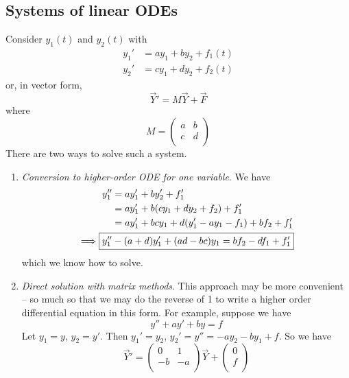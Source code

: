 \documentclass{../../template/note}
\begin{document}
    
    \subsection{Systems of linear ODEs}

    Consider \(y_1(t)\) and \(y_2(t)\) with
    \begin{align*}
        y_1' &= a y_1 + b y_2 + f_1(t) \\
        y_2' &= c y_1 + d y_2 + f_2(t)
    \end{align*}
    or, in vector form,
    \[
        \vec Y' = M \vec Y + \vec F
    \]
    where
    \[
        M = \begin{pmatrix}
         a & b \\
         c & d \\
        \end{pmatrix}
    \]
    There are two ways to solve such a system.
    \begin{enumerate}[label=\protect\circled{\arabic*}]
        \item \emph{Conversion to higher-order ODE for one variable}. We have
        \begin{align*}
            y_1'' &= ay_1' + by_2' + f_1' \\
            &= ay_1' + b(cy_1 + dy_2 + f_2) + f_1' \\
            &= ay_1' + bcy_1 + d(y_1' - ay_1 - f_1) + bf_2 + f_1' \\
            \implies \Aboxed{y_1'' &- (a+d)y_1' + (ad-bc)y_1 = bf_2 - df_1 + f_1'}
        \end{align*}
        which we know how to solve.
        \item \emph{Direct solution with matrix methods}. This approach may be more convenient -- so much so that we may do the reverse of 1 to write a higher order differential equation in this form. For example, suppose we have
        \[
            y'' + ay' + by = f
        \]
        Let \(y_1 = y\), \(y_2 = y'\). Then \(y_1' = y_2\), \(y_2' = y'' = -ay_2 -by_1 + f\). So we have
        \[
            \vec Y' = \begin{pmatrix}
             0 & 1 \\
             -b & -a \\
            \end{pmatrix} \vec Y + \begin{pmatrix}
             0 \\
             f \\
            \end{pmatrix}
        \]
    \end{enumerate}
\end{document}
